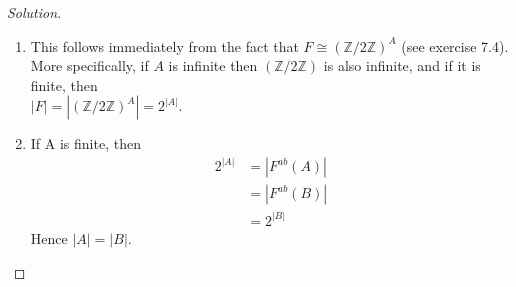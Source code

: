\documentclass[12pt]{article}
\newenvironment{solution}
  {\renewcommand\qedsymbol{$\blacksquare$}\begin{proof}[Solution]}
{\end{proof}}
\begin{document}
\begin{solution}~
  \begin{enumerate}
    \item This follows immediately from the fact that $F\cong (\mathbb{Z}/2\mathbb{Z})^A$ (see exercise 7.4).
      More specifically, if $A$ is infinite then $(\mathbb{Z}/2\mathbb{Z})$ is also infinite, and if it is
      finite, then \\$|F| = |(\mathbb{Z}/2\mathbb{Z})^A| = 2^{|A|}$.
    \item If A is finite, then 
      \begin{align*}
      2^{|A|} &= |F^{ab}(A)| \\
      &= |F^{ab}(B)| \\
      &= 2^{|B|}
      \end{align*}
      Hence $|A| = |B|$.
  \end{enumerate} 
\end{solution}
\end{document}
